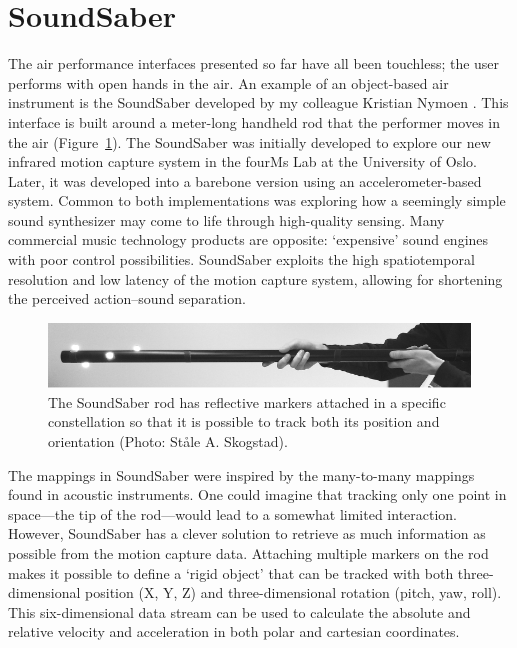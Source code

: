 \section{SoundSaber}

The air performance interfaces presented so far have all been touchless; the user performs with open hands in the air. An example of an object-based air instrument is the SoundSaber developed by my colleague Kristian Nymoen \citep{nymoen_soundsaber_2011}. This interface is built around a meter-long handheld rod that the performer moves in the air (Figure~\ref{fig:soundsaber}). The SoundSaber was initially developed to explore our new infrared motion capture system in the fourMs Lab at the University of Oslo. Later, it was developed into a barebone version using an accelerometer-based system. Common to both implementations was exploring how a seemingly simple sound synthesizer may come to life through high-quality sensing. Many commercial music technology products are opposite: `expensive' sound engines with poor control possibilities. SoundSaber exploits the high spatiotemporal resolution and low latency of the motion capture system, allowing for shortening the perceived action--sound separation.

\begin{figure}[tbp]
	\centering
		\includegraphics[width=\columnwidth]{figures/74-soundsaber-crop.pdf}
	\caption{The SoundSaber rod has reflective markers attached in a specific constellation so that it is possible to track both its position and orientation (Photo: Ståle A. Skogstad).}
	\label{fig:soundsaber}
\end{figure}

The mappings in SoundSaber were inspired by the many-to-many mappings found in acoustic instruments. One could imagine that tracking only one point in space---the tip of the rod---would lead to a somewhat limited interaction. However, SoundSaber has a clever solution to retrieve as much information as possible from the motion capture data. Attaching multiple markers on the rod makes it possible to define a `rigid object' that can be tracked with both three-dimensional position (X, Y, Z) and three-dimensional rotation (pitch, yaw, roll). This six-dimensional data stream can be used to calculate the absolute and relative velocity and acceleration in both polar and cartesian coordinates.

